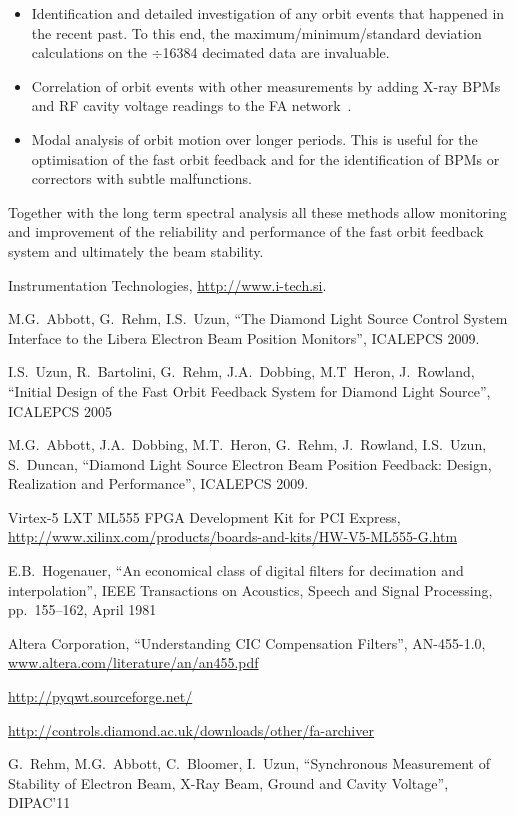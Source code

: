 \documentclass{JAC2003}
\begin{document}
\begin{itemize}

\item Identification and detailed investigation of any orbit events that
happened in the recent past.  To this end, the maximum/minimum/standard
deviation calculations on the $\div$16384 decimated data are invaluable.

\item Correlation of orbit events with other measurements by adding X-ray BPMs
and RF cavity voltage readings to the FA network~\cite{rehm}.

\item Modal analysis of orbit motion over longer periods. This is useful for the
optimisation of the fast orbit feedback and for the identification of BPMs or
correctors with subtle malfunctions.

\end{itemize}

Together with the long term spectral analysis all these methods allow monitoring
and improvement of the reliability and performance of the fast orbit feedback
system and ultimately the beam stability.



\begin{thebibliography}{99}

Instrumentation Technologies, \url{http://www.i-tech.si}.

M.G.~Abbott, G.~Rehm, I.S.~Uzun, ``The Diamond Light Source Control System
Interface to the Libera Electron Beam Position Monitors'', ICALEPCS 2009.

I.S.~Uzun, R.~Bartolini, G.~Rehm, J.A.~Dobbing, M.T~Heron, J.~Rowland, ``Initial
Design of the Fast Orbit Feedback System for Diamond Light Source'', ICALEPCS
2005

M.G.~Abbott, J.A.~Dobbing, M.T.~Heron, G.~Rehm, J.~Rowland, I.S.~Uzun,
S.~Duncan, ``Diamond Light Source Electron Beam Position Feedback: Design,
Realization and Performance'', ICALEPCS 2009.

Virtex-5 LXT ML555 FPGA Development Kit for PCI Express,
\url{http://www.xilinx.com/products/boards-and-kits/HW-V5-ML555-G.htm}

E.B.~Hogenauer, ``An economical class of digital filters for decimation and
interpolation'', IEEE Transactions on Acoustics, Speech and Signal Processing,
pp.~155--162, April 1981

Altera Corporation, ``Understanding CIC Compensation Filters'', AN-455-1.0,
\url{www.altera.com/literature/an/an455.pdf}

\url{http://pyqwt.sourceforge.net/}

\url{http://controls.diamond.ac.uk/downloads/other/fa-archiver}

G.~Rehm, M.G.~Abbott, C.~Bloomer, I.~Uzun,  ``Synchronous Measurement of
Stability of Electron Beam, X-Ray Beam, Ground and Cavity Voltage'', DIPAC'11


\end{thebibliography}
\end{document}
